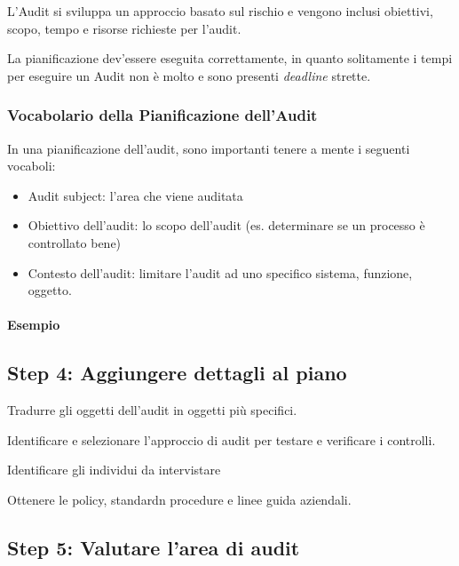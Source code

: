 L'Audit si sviluppa un approccio basato sul rischio e vengono inclusi obiettivi, 
scopo, tempo e risorse richieste per l'audit.

La pianificazione dev'essere eseguita correttamente, in quanto solitamente i 
tempi per eseguire un Audit non è molto e sono presenti \textit{deadline} 
strette.




\subsubsection{Vocabolario della Pianificazione dell'Audit}

In una pianificazione dell'audit, sono importanti tenere a mente i seguenti 
vocaboli:
\begin{itemize}
\item Audit subject: l'area che viene auditata
\item Obiettivo dell'audit: lo scopo dell'audit (es. determinare se un processo 
è controllato bene)
\item Contesto dell'audit: limitare l'audit ad uno specifico sistema, funzione, 
oggetto.
\end{itemize}

\paragraph*{Esempio}








\subsection{Step 4: Aggiungere dettagli al piano}


Tradurre gli oggetti dell'audit in oggetti più specifici.

Identificare e selezionare l'approccio di audit per testare e verificare i 
controlli.

Identificare gli individui da intervistare

Ottenere le policy, standardn procedure e linee guida aziendali.


\subsection{Step 5: Valutare l'area di audit}

